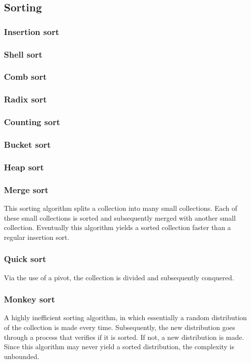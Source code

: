 \documentclass{article}
\begin{document}
\newpage

\subsection{Sorting}
\subsubsection{Insertion sort}
\subsubsection{Shell sort}
\subsubsection{Comb sort}
\subsubsection{Radix sort}
\subsubsection{Counting sort}
\subsubsection{Bucket sort}
\subsubsection{Heap sort}
\subsubsection{Merge sort}
This sorting algorithm splits a collection into many small collections.
Each of these small collections is sorted and subsequently merged with another small collection.
Eventually this algorithm yields a sorted collection faster than a regular insertion sort.

\subsubsection{Quick sort}
Via the use of a pivot, the collection is divided and subsequently conquered.

\subsubsection{Monkey sort}
A highly inefficient sorting algorithm, in which essentially a random distribution of the collection is made every time.
Subsequently, the new distribution goes through a process that verifies if it is sorted. If not, a new distribution is made.
Since this algorithm may never yield a sorted distribution, the complexity is unbounded.
\end{document}
